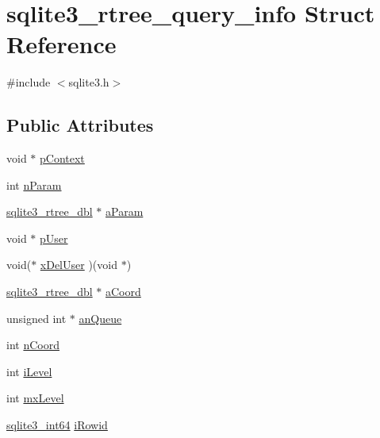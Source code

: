 \hypertarget{structsqlite3__rtree__query__info}{}\section{sqlite3\+\_\+rtree\+\_\+query\+\_\+info Struct Reference}
\label{structsqlite3__rtree__query__info}


{\ttfamily \#include $<$sqlite3.\+h$>$}

\subsection*{Public Attributes}
\begin{DoxyCompactItemize}
\item 
void $\ast$ \mbox{\hyperlink{structsqlite3__rtree__query__info_a21e4964ceeddedce2211c8a75067936d}{p\+Context}}
\item 
int \mbox{\hyperlink{structsqlite3__rtree__query__info_a9df4acb109f572455c8e2fb443027157}{n\+Param}}
\item 
\mbox{\hyperlink{sqlite3_8h_ae9156ff58620c1ceae9391f1afabae1b}{sqlite3\+\_\+rtree\+\_\+dbl}} $\ast$ \mbox{\hyperlink{structsqlite3__rtree__query__info_a61352eac82151fee3e4c7ff718612179}{a\+Param}}
\item 
void $\ast$ \mbox{\hyperlink{structsqlite3__rtree__query__info_a7c1d4f1f20c14b88c4dc02643e6706a0}{p\+User}}
\item 
void($\ast$ \mbox{\hyperlink{structsqlite3__rtree__query__info_a23bcc6df883995d42d65449a27f45f85}{x\+Del\+User}} )(void $\ast$)
\item 
\mbox{\hyperlink{sqlite3_8h_ae9156ff58620c1ceae9391f1afabae1b}{sqlite3\+\_\+rtree\+\_\+dbl}} $\ast$ \mbox{\hyperlink{structsqlite3__rtree__query__info_a9d6e605e62fcf49d57dfc0d192076542}{a\+Coord}}
\item 
unsigned int $\ast$ \mbox{\hyperlink{structsqlite3__rtree__query__info_ace9f952557eb7b0e050d879ebb80905a}{an\+Queue}}
\item 
int \mbox{\hyperlink{structsqlite3__rtree__query__info_aa4b95a36fe7306e17e8cf9329fcb0964}{n\+Coord}}
\item 
int \mbox{\hyperlink{structsqlite3__rtree__query__info_af91ca2d5f867b3b0aa9c91920a3b5b45}{i\+Level}}
\item 
int \mbox{\hyperlink{structsqlite3__rtree__query__info_ac84533734fb4c86c3f2deba904118785}{mx\+Level}}
\item 
\mbox{\hyperlink{sqlite3_8h_a0a4d3e6c1ad46f90e746b920ab6ca0d2}{sqlite3\+\_\+int64}} \mbox{\hyperlink{structsqlite3__rtree__query__info_a9e43489993c8aeace851f86eaa00ec26}{i\+Rowid}}

\end{DoxyCompactItemize}
